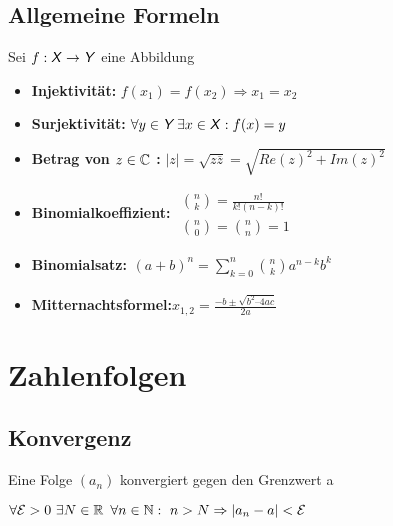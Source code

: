 \documentclass[german]{latex4ei/latex4ei_sheet}
\begin{document}
\begin{sectionbox}
	\subsection{Allgemeine Formeln}
	Sei $f:\operatorname{\textsf{\textit{X}}} \rightarrow \operatorname{\textsf{\textit{Y}}}$ eine Abbildung
	\begin{itemize}
	\item \textbf{Injektivität: } $f(x_1)=f(x_2) \Rightarrow x_1=x_2$
	\item \textbf{Surjektivität: } $\forall y \in \operatorname{\textsf{\textit{Y}}} \exists x \in \operatorname{\textsf{\textit{X}}} : f(x)=y$
	\item  \textbf{Betrag von $z \in \mathbb C$ :  } $|z|= \sqrt{z \overline{z}}= \sqrt{Re(z)^2+Im(z)^2}$
		\item \textbf{Binomialkoeffizient:} \begin{math}\begin{array}{l}
	\binom{n}{k} = \frac{n!}{k!(n-k)!}  \\
	\binom{n}{0} = \binom{n}{n} = 1
\end{array}\end{math}\\
\item \textbf{Binomialsatz:}\begin{math}\begin{array}{l}
	(a+b)^n = \sum\limits_{k = 0}^{n} \binom{n}{k} a^{n-k} b^{k}
\end{array}\end{math}

\item \textbf{Mitternachtsformel:}$x_{1,2} =   \frac{- b \pm \sqrt{b^{2} \text{--} 4ac}}{2a}$
	\end{itemize}

\end{sectionbox}




\section{Zahlenfolgen}


\begin{sectionbox}
	\subsection{Konvergenz}
	Eine Folge $(a_n)$ konvergiert gegen den Grenzwert a



	$\forall\mathcal{E}>0 \text{ }\exists N \in \operatorname{\mathbb R} \text{ }\forall n \in \operatorname{\mathbb N}:\text{ } n>N \Rightarrow |a_n - a|<\mathcal{E}$





\end{sectionbox}
\end{document}

